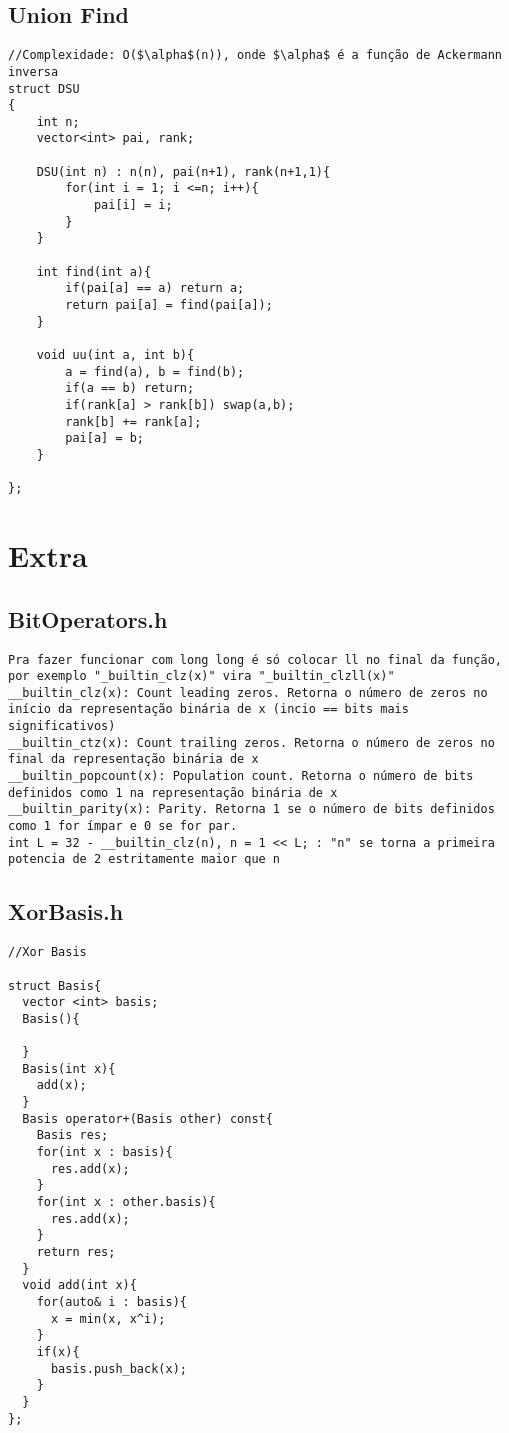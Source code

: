 \documentclass[11pt, a4paper, twoside]{article}
\begin{document}
\subsection{Union Find}
\begin{verbatim}
//Complexidade: O($\alpha$(n)), onde $\alpha$ é a função de Ackermann inversa
struct DSU
{
    int n;
    vector<int> pai, rank;
    
    DSU(int n) : n(n), pai(n+1), rank(n+1,1){
        for(int i = 1; i <=n; i++){
            pai[i] = i;
        }
    }
    
    int find(int a){
        if(pai[a] == a) return a;
        return pai[a] = find(pai[a]);
    }
    
    void uu(int a, int b){
        a = find(a), b = find(b);
        if(a == b) return;
        if(rank[a] > rank[b]) swap(a,b);
        rank[b] += rank[a];
        pai[a] = b;
    }
    
};
\end{verbatim}

\pagebreak


%
%

\section{Extra}

\subsection{BitOperators.h}
\begin{verbatim}
Pra fazer funcionar com long long é só colocar ll no final da função, por exemplo "_builtin_clz(x)" vira "_builtin_clzll(x)"
__builtin_clz(x): Count leading zeros. Retorna o número de zeros no início da representação binária de x (incio == bits mais significativos)
__builtin_ctz(x): Count trailing zeros. Retorna o número de zeros no final da representação binária de x
__builtin_popcount(x): Population count. Retorna o número de bits definidos como 1 na representação binária de x
__builtin_parity(x): Parity. Retorna 1 se o número de bits definidos como 1 for ímpar e 0 se for par.
int L = 32 - __builtin_clz(n), n = 1 << L; : "n" se torna a primeira potencia de 2 estritamente maior que n 
\end{verbatim}

\subsection{XorBasis.h}
\begin{verbatim}
//Xor Basis

struct Basis{
  vector <int> basis;
  Basis(){

  }
  Basis(int x){
    add(x);
  }
  Basis operator+(Basis other) const{
    Basis res;
    for(int x : basis){
      res.add(x);
    }
    for(int x : other.basis){
      res.add(x);
    }
    return res;
  }
  void add(int x){
    for(auto& i : basis){
      x = min(x, x^i);
    }
    if(x){
      basis.push_back(x);
    }
  }
};
\end{verbatim}
\end{document}
